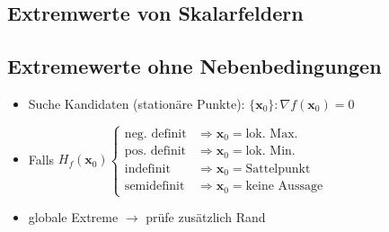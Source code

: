\documentclass[6pt,a4paper]{scrartcl}
\newcommand{\eset}[1]{\ensuremath{\bigl\{#1\bigr\}}}											%
\renewcommand{\vec}[1]{\ensuremath{\boldsymbol {#1}}}											%
\newcommand{\ra}[0]{\ensuremath{\rightarrow}} 									%
\begin{document}
\begin{multicols*}{4}
\section{Extremwerte von Skalarfeldern}
\subsection{Extremewerte ohne Nebenbedingungen} %
\begin{itemize} \itemsep0pt
	\item Suche Kandidaten (stationäre Punkte): $\eset{\vec x_0}:{\nabla f(\vec x_0) = 0}$
	\item Falls $H_f(\vec x_0) \begin{cases} \text{neg. definit} & \Rightarrow \vec x_0 = \text{lok. Max.} \\ \text{pos. definit} & \Rightarrow \vec x_0 = \text{lok. Min.} \\ \text{indefinit} & \Rightarrow \vec x_0 = \text{Sattelpunkt} \\ \text{semidefinit} & \Rightarrow \vec x_0 = \text{keine Aussage} \end{cases}$\\
	\item globale Extreme $\ra $ prüfe zusätzlich Rand
\end{itemize}


\end{multicols*}
\end{document}
